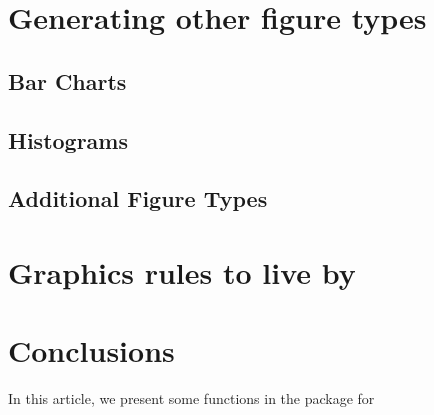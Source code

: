 \documentclass[nojss]{jss}\usepackage[]{graphicx}\usepackage[]{color}
\begin{document}
\section{Generating other figure types}\label{S:alternateFigures}

\subsection{Bar Charts}

\subsection{Histograms}

\subsection{Additional Figure Types}


\section{Graphics rules to live by}\label{S:rules}

\section{Conclusions} \label{S:concl}
In this article, we present some functions in the  package for  



\end{document}
